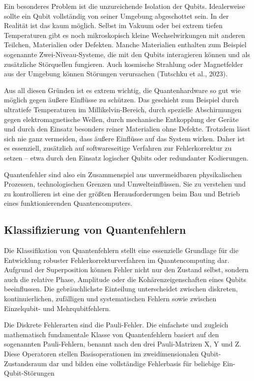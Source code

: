Ein besonderes Problem ist die unzureichende Isolation der Qubits. Idealerweise sollte ein Qubit vollständig von seiner Umgebung abgeschottet sein. In der Realität ist das kaum möglich. Selbst im Vakuum oder bei extrem tiefen Temperaturen gibt es noch mikroskopisch kleine Wechselwirkungen mit anderen Teilchen, Materialien oder Defekten. Manche Materialien enthalten zum Beispiel sogenannte Zwei-Niveau-Systeme, die mit den Qubits interagieren können und als zusätzliche Störquellen fungieren. Auch kosmische Strahlung oder Magnetfelder aus der Umgebung können Störungen verursachen (Tutschku et al., 2023).

Aus all diesen Gründen ist es extrem wichtig, die Quantenhardware so gut wie möglich gegen äußere Einflüsse zu schützen. Das geschieht zum Beispiel durch ultratiefe Temperaturen im Millikelvin-Bereich, durch spezielle Abschirmungen gegen elektromagnetische Wellen, durch mechanische Entkopplung der Geräte und durch den Einsatz besonders reiner Materialien ohne Defekte. Trotzdem lässt sich nie ganz vermeiden, dass äußere Einflüsse auf das System wirken. Daher ist es essenziell, zusätzlich auf softwareseitige Verfahren zur Fehlerkorrektur zu setzen – etwa durch den Einsatz logischer Qubits oder redundanter Kodierungen.

Quantenfehler sind also ein Zusammenspiel aus unvermeidbaren physikalischen Prozessen, technologischen Grenzen und Umwelteinflüssen. Sie zu verstehen und zu kontrollieren ist eine der größten Herausforderungen beim Bau und Betrieb eines funktionierenden Quantencomputers.

\subsection{Klassifizierung von Quantenfehlern}
Die Klassifikation von Quantenfehlern stellt eine essenzielle Grundlage für die Entwicklung robuster Fehlerkorrekturverfahren im Quantencomputing dar. Aufgrund der Superposition können Fehler nicht nur den Zustand selbst, sondern auch die relative Phase, Amplitude oder die Kohärenzeigenschaften eines Qubits beeinflussen. Die gebräuchlichste Einteilung unterscheidet zwischen diskreten, kontinuierlichen, zufälligen und systematischen Fehlern sowie zwischen Einzelqubit- und Mehrqubitfehlern.

Die Diskrete Fehlerarten sind die Pauli-Fehler. Die einfachste und zugleich mathematisch fundamentale Klasse von Quantenfehlern basiert auf den sogenannten Pauli-Fehlern, benannt nach den drei Pauli-Matrizen 
X, Y und Z. Diese Operatoren stellen Basisoperationen im zweidimensionalen Qubit-Zustandsraum dar und bilden eine vollständige Fehlerbasis für beliebige Ein-Qubit-Störungen


